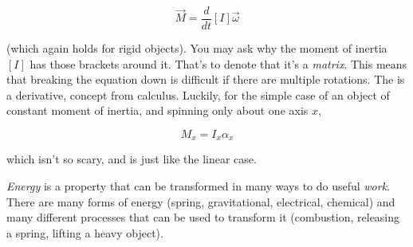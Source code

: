 \begin{equation}
	\vec{M} = \frac{d}{dt} [I] \vec{\omega}
\end{equation}

(which again holds for rigid objects). You may ask why the moment of inertia $[I]$ has those brackets around it. That's to denote that it's a \textit{matrix}. This means that breaking the equation down is difficult if there are multiple rotations. The  is a derivative, concept from calculus. Luckily, for the simple case of an object of constant moment of inertia, and spinning only about one axis $x$,

\begin{equation}
	M_x = I_x \alpha_x
\end{equation}

which isn't so scary, and is just like the linear case.

\textit{Energy} is a property that can be transformed in many ways to do useful \textit{work}. There are many forms of energy (spring, gravitational, electrical, chemical) and many different processes that can be used to transform it (combustion, releasing a spring, lifting a heavy object).